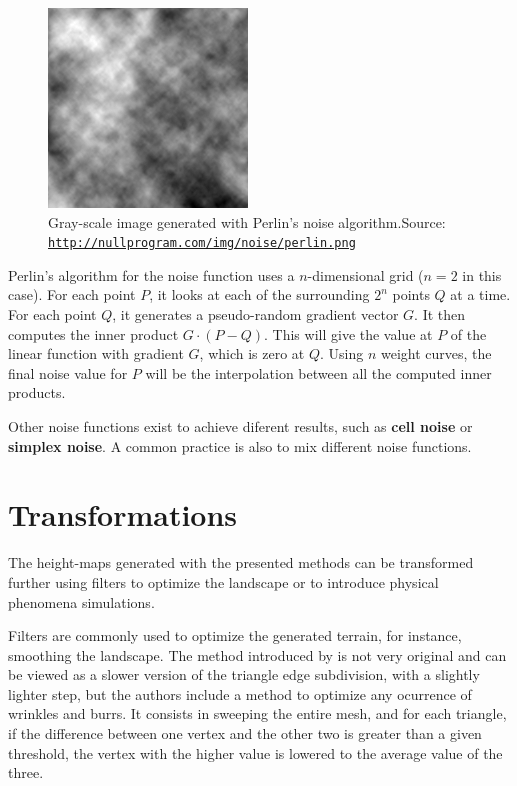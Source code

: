 \documentclass{acmtog}
\begin{document}
\begin{figure}
	\begin{center}
		\includegraphics[width=0.6\columnwidth]{images/perlin.png}
	\end{center}
	\caption{Gray-scale image generated with Perlin's noise algorithm.\newline Source: \texttt{\url{http://nullprogram.com/img/noise/perlin.png}}}
	\label{fig:perlin}
\end{figure}

Perlin's algorithm for the noise function uses a $n$-dimensional grid ($n=2$ in this case). For each point $P$, it looks at each of the surrounding $2^{n}$ points $Q$ at a time. For each point $Q$, it generates a pseudo-random gradient vector $G$. It then computes the inner product $G \cdot ( P - Q )$. This will give the value at $P$ of the linear function with gradient $G$, which is zero at $Q$. Using $n$ weight curves, the final noise value for $P$ will be the interpolation between all the computed inner products.

Other noise functions exist to achieve diferent results, such as \textbf{cell noise} or \textbf{simplex noise}. A common practice is also to mix different noise functions.

\section{Transformations}
The height-maps generated with the presented methods can be transformed further using filters to optimize the landscape or to introduce physical phenomena simulations.

Filters are commonly used to optimize the generated terrain, for instance, smoothing the landscape. The method introduced by \cite{Chen11} is not very original and can be viewed as a slower version of the triangle edge subdivision, with a slightly lighter step, but the authors include a method to optimize any ocurrence of wrinkles and burrs. It consists in sweeping the entire mesh, and for each triangle, if the difference between one vertex and the other two is greater than a given threshold, the vertex with the higher value is lowered to the average value of the three.
\end{document}

